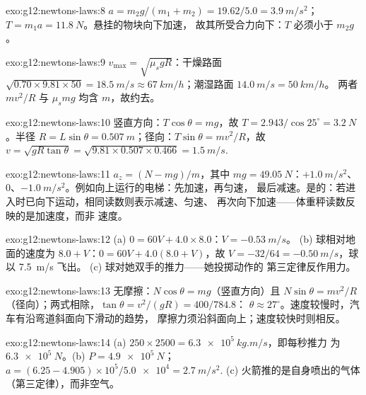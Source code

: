 \begin{solution}{exo:g12:newtons-laws:8}
$a = m_2 g/(m_1 + m_2) = 19.62/5.0 = \qty{3.9}{m/s^2}$；
$T = m_1 a = \qty{11.8}{N}$。悬挂的物块向下加速，
故其所受合力向下：$T$ 必须小于 $m_2 g$。
\end{solution}

\begin{solution}{exo:g12:newtons-laws:9}
$v_{\max} = \sqrt{\mu_s g R}$：干燥路面
$\sqrt{0.70 \times 9.81 \times 50} = \qty{18.5}{m/s} \approx
\qty{67}{km/h}$；潮湿路面 $\qty{14.0}{m/s} = \qty{50}{km/h}$。
两者 $mv^2/R$ 与 $\mu_s mg$ 均含 $m$，故约去。
\end{solution}

\begin{solution}{exo:g12:newtons-laws:10}
竖直方向：$T\cos\theta = mg$，故
$T = 2.943/\cos 25^\circ = \qty{3.2}{N}$。半径 $R = L\sin\theta =
\qty{0.507}{m}$；径向：$T\sin\theta = mv^2/R$，故
$v = \sqrt{gR\tan\theta} = \sqrt{9.81 \times 0.507 \times 0.466}
= \qty{1.5}{m/s}$.
\end{solution}

\begin{solution}{exo:g12:newtons-laws:11}
$a_z = (N - mg)/m$，其中 $mg = \qty{49.05}{N}$：$+\qty{1.0}{m/s^2}$、
$0$、$-\qty{1.0}{m/s^2}$。例如向上运行的电梯：先加速，再匀速，
最后减速。是的：若进入时已向下运动，相同读数则表示减速、匀速、
再次向下加速——体重秤读数反映的是加速度，而非
速度。
\end{solution}

\begin{solution}{exo:g12:newtons-laws:12}
(a) $0 = 60V + 4.0 \times 8.0$：$V = \qty{-0.53}{m/s}$。
(b) 球相对地面的速度为 $8.0 + V$：$0 = 60V + 4.0(8.0 + V)$，故
$V = -32/64 = \qty{-0.50}{m/s}$，球以 \qty{7.5}{m/s} 飞出。
(c) 球对她双手的推力——她投掷动作的
第三定律反作用力。
\end{solution}

\begin{solution}{exo:g12:newtons-laws:13}
无摩擦：$N\cos\theta = mg$（竖直方向）且 $N\sin\theta =
mv^2/R$（径向）；两式相除，$\tan\theta = v^2/(gR) = 400/784.8$：
$\theta \approx 27^\circ$。速度较慢时，汽车有沿弯道斜面向下滑动的趋势，
摩擦力须沿斜面向上；速度较快时则相反。
\end{solution}

\begin{solution}{exo:g12:newtons-laws:14}
(a) $250 \times 2500 = \qty{6.3e5}{kg.m/s}$，即每秒推力
为 $\qty{6.3e5}{N}$。(b) $P = \qty{4.9e5}{N}$；
$a = (6.25 - 4.905) \times 10^5 / \num{5.0e4} = \qty{2.7}{m/s^2}$.
(c) 火箭推的是自身喷出的气体（第三定律），而非空气。
\end{solution}

